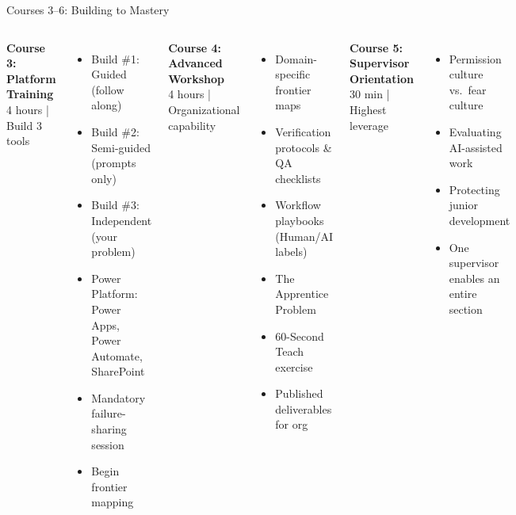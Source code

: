 \documentclass[aspectratio=169,11pt]{beamer}
\newcommand{\navy}[1]{\textbf{\color{navyblue}#1}}
\begin{document}
\begin{frame}[shrink=5]{Courses 3--6: Building to Mastery}

\begin{columns}[T]

\navy{Course 3: Platform Training}\\
{\scriptsize 4 hours | Build 3 tools}

\begin{itemize}\scriptsize
  \item Build \#1: Guided (follow along)
  \item Build \#2: Semi-guided (prompts only)
  \item Build \#3: Independent (your problem)
  \item Power Platform: Power Apps, Power Automate, SharePoint
  \item Mandatory failure-sharing session
  \item Begin frontier mapping
\end{itemize}


\navy{Course 4: Advanced Workshop}\\
{\scriptsize 4 hours | Organizational capability}

\begin{itemize}\scriptsize
  \item Domain-specific frontier maps
  \item Verification protocols \& QA checklists
  \item Workflow playbooks (Human/AI labels)
  \item The Apprentice Problem
  \item 60-Second Teach exercise
  \item Published deliverables for org
\end{itemize}


\navy{Course 5: Supervisor Orientation}\\
{\scriptsize 30 min | Highest leverage}

\begin{itemize}\scriptsize
  \item Permission culture vs.\ fear culture
  \item Evaluating AI-assisted work
  \item Protecting junior development
  \item One supervisor enables an entire section
\end{itemize}


\end{columns}
\end{frame}
\end{document}
